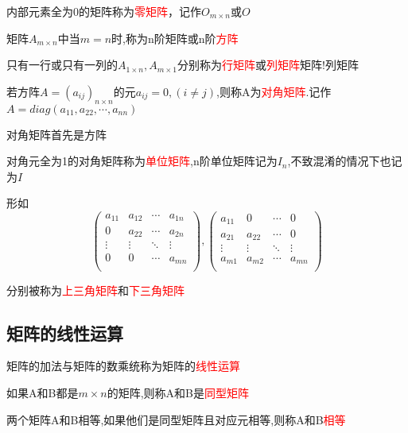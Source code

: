 内部元素全为0的矩阵称为\textcolor{red}{零矩阵}，记作$O_{m\times n}$或$O$

矩阵$A_{m\times n}$中当$m=n$时,称为n阶矩阵或n阶\textcolor{red}{方阵}

只有一行或只有一列的$A_{1\times n},A_{m\times 1}$分别称为\textcolor{red}{行矩阵}或\textcolor{red}{列矩阵}{矩阵!列矩阵}

若方阵$A=(a_{ij})_{n\times n}$的元$a_{ij}=0,(i\neq j)$,则称A为\textcolor{red}{对角矩阵}.记作$A=diag(a_{11},a_{22},\cdots,a_{nn})$

\begin{note}
	对角矩阵首先是方阵
\end{note}

对角元全为1的对角矩阵称为\textcolor{red}{单位矩阵},n阶单位矩阵记为$I_n$,不致混淆的情况下也记为$I$

形如
\begin{equation*}
\begin{pmatrix}
		a_{11} &a_{12}&\cdots&a_{1n}\\
	0&a_{22}&\cdots&a_{2n}\\
	\vdots&\vdots&\ddots&\vdots\\
	0&0&\cdots&a_{mn}\\
\end{pmatrix},
\begin{pmatrix}
		a_{11} &0&\cdots&0\\
	a_{21}&a_{22}&\cdots&0\\
	\vdots&\vdots&\ddots&\vdots\\
	a_{m1}&a_{m2}&\cdots&a_{mn}\\
\end{pmatrix}
\end{equation*}

分别被称为\textcolor{red}{上三角矩阵}和\textcolor{red}{下三角矩阵}

\subsection{矩阵的线性运算}
\begin{note}
矩阵的加法与矩阵的数乘统称为矩阵的\textcolor{red}{线性运算}
\end{note}
如果A和B都是$m\times n$的矩阵,则称A和B是\textcolor{red}{同型矩阵}

\begin{definition}
	两个矩阵A和B相等,如果他们是同型矩阵且对应元相等,则称A和B\textcolor{red}{相等}
\end{definition}

